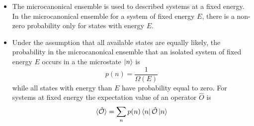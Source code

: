 \documentclass[11pt, a4paper]{article}
\begin{document}
\begin{itemize}

	\item The microcanonical ensemble is used to described systems at a fixed energy. In the microcanonical ensemble for a system of fixed energy $ E $, there is a non-zero probability only for states with energy $ E $. 
	
	\item Under the assumption that all available states are equally likely, the probability in the microcanonical ensemble that an isolated system of fixed energy $ E $ occurs in a the microstate $ \ket{n} $ is 
	\begin{equation*}
		p(n) = \frac{1}{\Omega(E)}
	\end{equation*}
	while all states with energy than $ E $ have probability equal to zero.	For systems at fixed energy the expectation value of an operator $ \hat{O} $ is 
	\begin{equation*}
		\langle \hat{\mathcal{O}} \rangle = \sum_{n}p(n)\bra{n}\hat{\mathcal{O}}\ket{n}
	\end{equation*}
\end{itemize}
\end{document}
